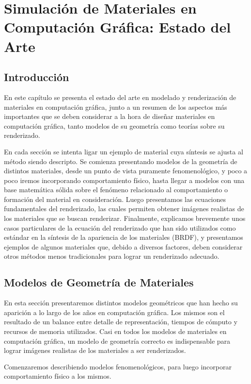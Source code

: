 
\chapter[Estado del Arte]{Simulación de Materiales en Computación Gráfica: Estado del Arte}
\section{Introducción} %
En este capítulo se presenta el estado del arte en modelado y renderización de materiales en computación gráfica, junto a un resumen de los aspectos más importantes que se deben considerar a la hora de diseñar materiales en computación gráfica, tanto modelos de su geometría como teorías sobre su renderizado.

En cada sección se intenta ligar un ejemplo de material cuya síntesis se ajusta al método 
siendo descripto.
Se comienza presentando modelos de la geometría de distintos materiales, desde un punto de vista puramente fenomenológico, y poco a poco iremos incorporando comportamiento físico, hasta llegar a modelos con una base matemática sólida sobre el fenómeno relacionado al comportamiento o formación del material en consideración.
Luego presentamos las ecuaciones fundamentales del renderizado, las cuales permiten obtener imágenes realistas de los materiales que se buscan renderizar.
Finalmente, explicamos brevemente unos casos particulares de la ecuación del renderizado que han sido utilizados como estándar en la síntesis de la apariencia de los materiales (BRDF), y presentamos ejemplos de algunos materiales que, debido a diversos factores, deben considerar otros métodos menos tradicionales para lograr un renderizado adecuado.

\section{Modelos de Geometría de Materiales}
En esta sección presentaremos distintos modelos geométricos que han hecho su aparición a lo largo de los años en computación gráfica.
Los mismos son el resultado de un balance entre detalle de representación, tiempos de cómputo y recursos de memoria utilizados.
Casi en todos los modelos de materiales en computación gráfica, un modelo de geometría correcto es indispensable para lograr imágenes realistas de los materiales a ser renderizados.

Comenzaremos describiendo modelos fenomenológicos, para luego incorporar comportamiento físico a los mismos.

